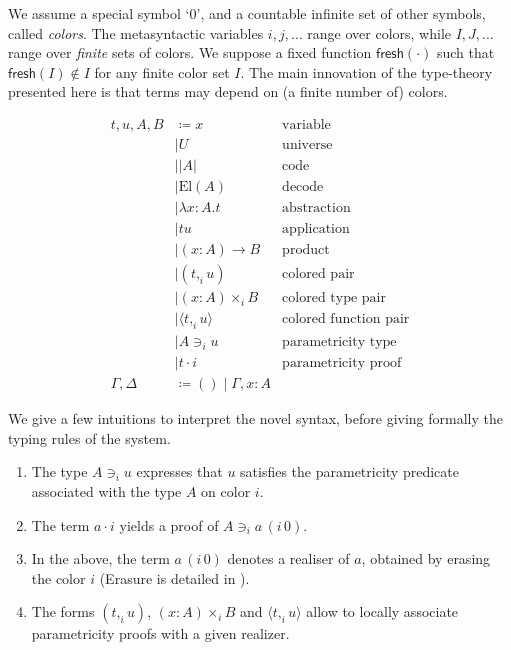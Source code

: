 \documentclass[english]{PaperTools/latex/lipics}
\newcommand\CP[3]{(#2,_{#1} #3)}
\newcommand\CTimes[2]{(#2) ×_{#1}}
\newcommand\param[1]{\!\cdot\!#1}
\newcommand\op[1]{∋_{#1}}
\newcommand\fp[3]{⟨#2 ,_{#1} #3⟩}
\newcommand\mor[2]{({#1}\,{#2})}
\newcommand\proj[2]{{#2}\,\mor{#1}0}
\def\fresh#1{\mathsf{fresh}(#1)}
\def\El#1{\mathrm{El}(#1)}
\begin{document}
We assume a special symbol ‘0’, and a countable infinite set of other
symbols, called \emph{colors}.
The metasyntactic variables $i,j,\ldots$ range over colors, while
$I,J,…$ range over \emph{finite} sets of colors.
We suppose a fixed function $\fresh{·}$ such that
$\fresh{I} ∉ I$ for any finite color set $I$.
%
The main innovation of the type-theory
presented here is that terms may depend on (a finite number of)
colors.
\begin{definition}
  \begin{align*}
    t,u,A,B & \coloneqq x & \text {variable} \\
            & \mid U & \text{universe} \\ 
            & \mid |A| & \text{code} \\ 
            & \mid \El{A} & \text{decode} \\
            & \mid λx:A. t & \text{abstraction} \\
            & \mid t u & \text{application} \\ 
            & \mid (x:A) → B & \text{product} \\
            & \mid \CP i t u & \text{colored pair} \\
            & \mid \CTimes i {x:A} B  & \text{colored type pair} \\
            & \mid \fp i t u & \text{colored function pair}\\
            & \mid A \op i u & \text{parametricity type} \\
            & \mid t \param i & \text{parametricity proof} \\
    \Gamma,\Delta & \coloneqq () \mid \Gamma,x:A
  \end{align*}
\end{definition}

We give a few intuitions to interpret the novel syntax, before giving formally the typing rules of the system. 
\begin{enumerate}
\item The type $A \op i u$ expresses that $u$ satisfies the
  parametricity predicate associated with the type $A$ on color $i$.
\item The term $a \param i$ yields a proof of $A \op i \proj i a$.
\item In the above, the term $\proj i a$ denotes a realiser of $a$,
  obtained by erasing the color $i$ (Erasure is detailed in
  ).
\item The forms $\CP i t u$, $\CTimes i {x:A} B$ and $\fp i t u$ allow to
  locally associate parametricity proofs with a given realizer.
\end{enumerate}
\end{document}
